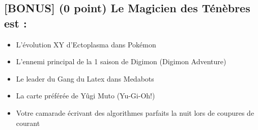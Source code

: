 \documentclass[11pt,a4paper]{article}
\begin{document}
\bigskip


\subsection{[BONUS] (0 point) Le Magicien des Ténèbres est : }

\begin{itemize}
  \item[\CaseCoche] L'évolution XY d'Ectoplasma dans Pokémon \\
  \item[\CaseCoche] L'ennemi principal de la 1 saison de Digimon (Digimon Adventure) \\
  \item[\CaseCoche] Le leader du Gang du Latex dans Medabots \\
  \item[\checkmark] La carte préférée de Yûgi Muto (Yu-Gi-Oh!) \\ %
  \item[\checkmark] Votre camarade écrivant des algorithmes parfaits la nuit lors de coupures de courant \\ %
\end{itemize}
\end{document}
